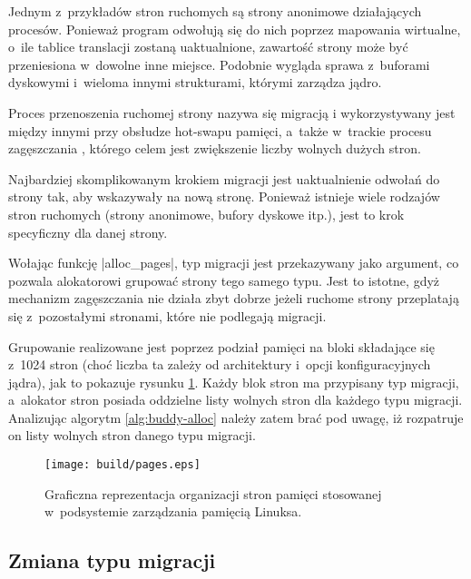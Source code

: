 Jednym z~przykładów stron ruchomych są strony anonimowe działających
procesów.  Ponieważ program odwołują się do nich poprzez mapowania
wirtualne, o~ile tablice translacji zostaną uaktualnione, zawartość
strony może być przeniesiona w~dowolne inne miejsce.  Podobnie wygląda
sprawa z~buforami dyskowymi i~wieloma innymi strukturami, którymi
zarządza jądro.

Proces przenoszenia ruchomej strony nazywa się migracją
i wykorzystywany jest między innymi przy obsłudze hot-swapu pamięci,
a~także w~trackie procesu zagęszczania \autocite{bib:compaction,
  bib:supporting-large-contig-regions}, którego celem jest zwiększenie
liczby wolnych dużych stron.

Najbardziej skomplikowanym krokiem migracji jest uaktualnienie odwołań
do strony tak, aby wskazywały na nową stronę.  Ponieważ istnieje wiele
rodzajów stron ruchomych (strony anonimowe, bufory dyskowe itp.), jest
to krok specyficzny dla danej strony.

Wołając funkcję \code|alloc_pages|, typ migracji jest przekazywany
jako argument, co pozwala alokatorowi grupować strony tego samego
typu.  Jest to istotne, gdyż mechanizm zagęszczania nie działa zbyt
dobrze jeżeli ruchome strony przeplatają się z~pozostałymi stronami,
które nie podlegają migracji.

Grupowanie realizowane jest poprzez podział pamięci na bloki
składające się z~1024 stron (choć liczba ta zależy od architektury
i~opcji konfiguracyjnych jądra), jak to pokazuje rysunku
\ref{fig:pages}.  Każdy blok stron ma przypisany typ migracji,
a~alokator stron posiada oddzielne listy wolnych stron dla każdego
typu migracji.  Analizując algorytm \ref{alg:buddy-alloc} należy zatem
brać pod uwagę, iż rozpatruje on listy wolnych stron danego typu
migracji.

\begin{figure}[btp]
\begin{center}
\texttt{[image: build/pages.eps]}
\end{center}
\caption[Organizacja pamięci w~Linuksie.]{Graficzna reprezentacja
  organizacji stron pamięci stosowanej w~podsystemie zarządzania
  pamięcią Linuksa.}
\label{fig:pages}
\end{figure}


\subsection{Zmiana typu migracji}\label{sec:type-change}

